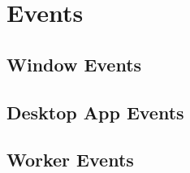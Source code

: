 
\section{Events}
\subsection{Window Events}
\subsection{Desktop App Events}
\subsection{Worker Events}